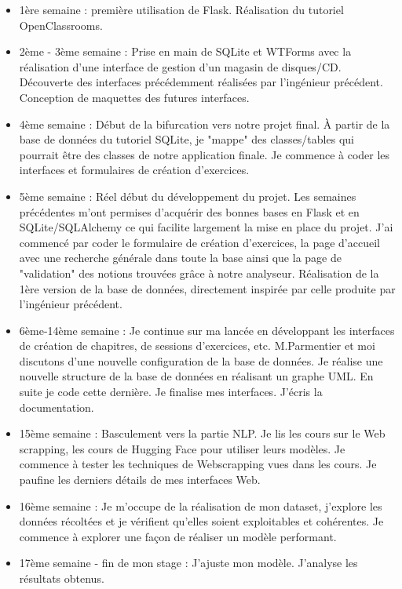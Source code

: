 \documentclass[12pt]{article}
\begin{document}
\begin{itemize}
    \item 1ère semaine : première utilisation de Flask. Réalisation du tutoriel OpenClassrooms. 
    
    \item 2ème - 3ème semaine : Prise en main de SQLite et WTForms avec la réalisation d'une interface de gestion d'un magasin de disques/CD. Découverte des interfaces précédemment réalisées par l'ingénieur précédent. Conception de maquettes des futures interfaces.
    
    \item 4ème semaine : Début de la bifurcation vers notre projet final. À partir de la base de données du tutoriel SQLite, je "mappe" des classes/tables qui pourrait être des classes de notre application finale. Je commence à coder les interfaces et formulaires de création d'exercices.
    
    \item 5ème semaine : Réel début du développement du projet. Les semaines précédentes m'ont permises d'acquérir des bonnes bases en Flask et en SQLite/SQLAlchemy ce qui facilite largement la mise en place du projet. J'ai commencé par coder le formulaire de création d'exercices, la page d'accueil avec une recherche générale dans toute la base ainsi que la page de "validation" des notions trouvées grâce à notre analyseur. Réalisation de la 1ère version de la base de données, directement inspirée par celle produite par l'ingénieur précédent.
    
    \item 6ème-14ème semaine : Je continue sur ma lancée en développant les interfaces de création de chapitres, de sessions d'exercices, etc. M.Parmentier et moi discutons d'une nouvelle configuration de la base de données. Je réalise une nouvelle structure de la base de données en réalisant un graphe UML. En suite je code cette dernière. Je finalise mes interfaces. J'écris la documentation.
    
    \item 15ème semaine : Basculement vers la partie NLP. Je lis les cours sur le Web scrapping, les cours de Hugging Face pour utiliser leurs modèles. Je commence à tester les techniques de Webscrapping vues dans les cours. Je paufine les derniers détails de mes interfaces Web.
    
    \item 16ème semaine : Je m'occupe de la réalisation de mon dataset, j'explore les données récoltées et je vérifient qu'elles soient exploitables et cohérentes. Je commence à explorer une façon de réaliser un modèle performant.
    
    \item 17ème semaine - fin de mon stage : J'ajuste mon modèle. J'analyse les résultats obtenus. 

\end{itemize}
\end{document}

